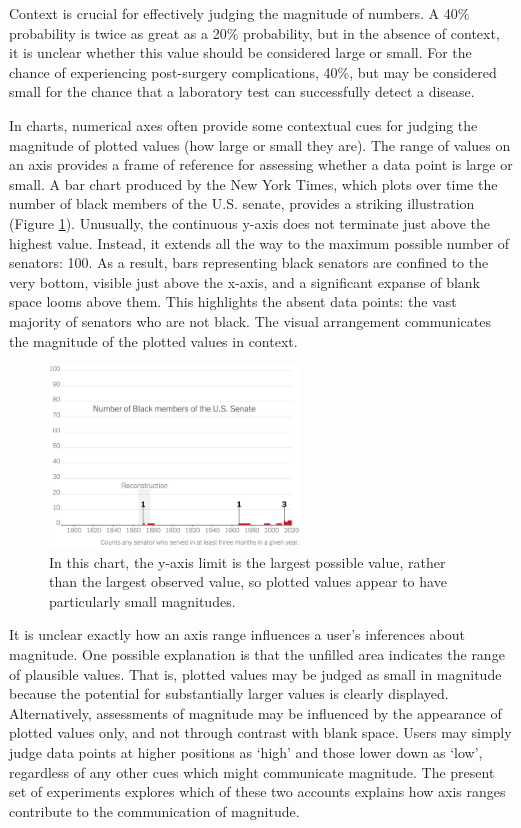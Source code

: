 \documentclass[journal]{vgtc}                %
\begin{document}
Context is crucial for effectively judging the magnitude of numbers. A 40\% probability is twice as great as a 20\% probability, but in the absence of context, it is unclear whether this value should be considered large or small. For the chance of experiencing post-surgery complications, 40\%, but may be considered small for the chance that a laboratory test can successfully detect a disease.

In charts, numerical axes often provide some contextual cues for judging the magnitude of plotted values (how large or small they are). The range of values on an axis provides a frame of reference for assessing whether a data point is large or small. A bar chart produced by the New York Times, which plots over time the number of black members of the U.S. senate, provides a striking illustration (Figure \ref{fig:nyt-chart}). Unusually, the continuous y-axis does not terminate just above the highest value. Instead, it extends all the way to the maximum possible number of senators: 100. As a result, bars representing black senators are confined to the very bottom, visible just above the x-axis, and a significant expanse of blank space looms above them. This highlights the absent data points: the vast majority of senators who are not black. The visual arrangement communicates the magnitude of the plotted values in context.~

\begin{figure}
\includegraphics[width=250px]{figures/nyt-chart} \caption{In this chart, the y-axis limit is the largest possible value, rather than the largest observed value, so plotted values appear to have particularly small magnitudes.}\label{fig:nyt-chart}
\end{figure}

It is unclear exactly how an axis range influences a user's inferences about magnitude. One possible explanation is that the unfilled area indicates the range of plausible values. That is, plotted values may be judged as small in magnitude because the potential for substantially larger values is clearly displayed. Alternatively, assessments of magnitude may be influenced by the appearance of plotted values only, and not through contrast with blank space. Users may simply judge data points at higher positions as `high' and those lower down as `low', regardless of any other cues which might communicate magnitude. The present set of experiments explores which of these two accounts explains how axis ranges contribute to the communication of magnitude.
\end{document}
